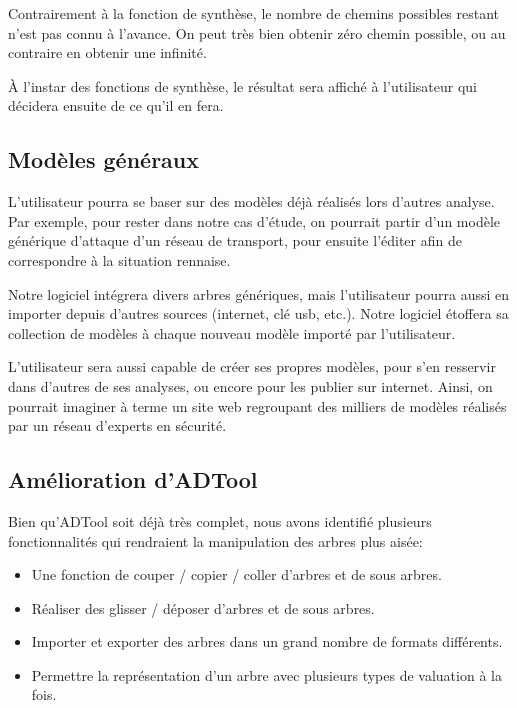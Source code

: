         Contrairement à la fonction de synthèse, le nombre de chemins possibles restant n'est pas connu à l'avance. On peut très bien obtenir zéro chemin possible, ou au contraire en obtenir une infinité. %

        \`A l'instar des fonctions de synthèse, le résultat sera affiché à l'utilisateur qui décidera ensuite de ce qu'il en fera. %

    \subsection{Modèles généraux}
        \label{sec:modele}


        L'utilisateur pourra se baser sur des modèles déjà réalisés lors d'autres analyse. Par exemple, pour rester dans notre cas d'étude, on pourrait partir d'un modèle générique d'attaque d'un réseau de transport, pour ensuite l'éditer afin de correspondre à la situation rennaise.

        Notre logiciel intégrera divers arbres génériques, mais l'utilisateur pourra aussi en importer depuis d'autres sources (internet, clé usb, etc.). Notre logiciel étoffera sa collection de modèles à chaque nouveau modèle importé par l'utilisateur.

        L'utilisateur sera aussi capable de créer ses propres modèles, pour s'en resservir dans d'autres de ses analyses, ou encore pour les publier sur internet. Ainsi, on pourrait imaginer à terme un site web regroupant des milliers de modèles réalisés par un réseau d'experts en sécurité.

    \subsection{Amélioration d'ADTool}
        \label{sec:adtoolpp}

        Bien qu'ADTool soit déjà très complet, nous avons identifié plusieurs fonctionnalités qui rendraient la manipulation des arbres plus aisée:
        \begin{itemize}
            \item Une fonction de couper / copier / coller d'arbres et de sous arbres.
            \item Réaliser des glisser / déposer d'arbres et de sous arbres.
            \item Importer et exporter des arbres dans un grand nombre de formats différents.
            \item Permettre la représentation d'un arbre avec plusieurs types de valuation à la fois.
        \end{itemize}

